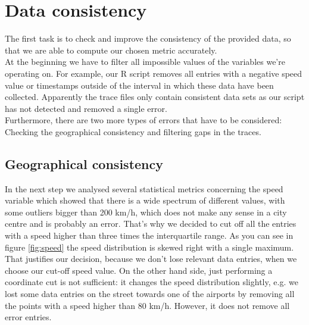 \documentclass[11pt,conference,a4paper,twocolumns,romanappendices]{IEEEtran}
\begin{document}
\section{Data consistency}
The first task is to check and improve the consistency of the provided data, so that we are able to compute our chosen metric accurately. \\
At the beginning we have to filter all impossible values of the variables we're operating on. For example, our R script removes all entries with a negative speed value or timestamps outside of the interval in which these data have been collected.  Apparently the trace files only contain consistent data sets as our script has not detected and removed a single error. \\
Furthermore, there are two more types of errors that have to be considered: Checking the geographical consistency and filtering gaps in the traces.
\subsection{Geographical consistency}

In the next step we analysed several statistical metrics concerning the speed variable which showed that there is a wide spectrum of different values, with some outliers bigger than 200 km/h, which does not make any sense in a city centre and is probably an error. That's why we decided to cut off all the entries with a speed higher than three times the interquartile range. As you can see in figure \ref{fig:speed} the speed distribution is skewed right with a single maximum. That justifies our decision, because we don't lose relevant data entries, when we choose our cut-off speed value. On the other hand side, just performing a coordinate cut is not sufficient: it changes the speed distribution slightly, e.g. we lost some data entries on the street towards one of the airports by removing all the points with a speed higher than 80 km/h. However, it does not remove all error entries. \\
\end{document}
